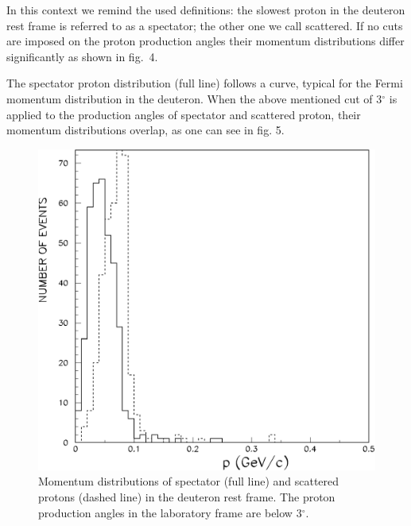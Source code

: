 \documentclass[epj]{svjour}
\begin{document}
In this context we remind the used definitions: the slowest proton in the
deuteron rest frame is referred to as a spectator; the other one we call
scattered. If no cuts are imposed on the proton production angles their momentum
distributions differ significantly as shown in fig.~4.

The spectator proton distribution (full line) follows a curve, typical for the
Fermi momentum distribution in the deuteron. When the above mentioned cut of
3$^\circ$ is applied to the production angles of spectator and scattered proton,
their momentum distributions overlap, as one can see in fig. 5.

\begin{figure}
  \centering
  \includegraphics[width=0.92\columnwidth]{fig5.pdf}
  \caption{Momentum distributions of spectator (full line) and scattered protons
    (dashed line) in the deuteron rest frame. The proton production angles in
    the laboratory frame are below 3$^{\circ}$.}
\end{figure}
\end{document}
